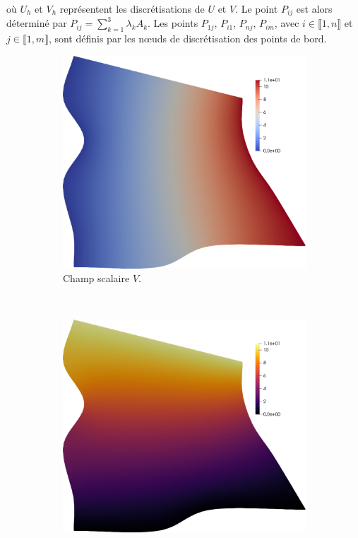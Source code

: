 où $U_h$ et $V_h$ représentent les discrétisations de $U$ et $V$. Le point $P_{ij}$ est alors déterminé par $P_{ij}=\sum_{k=1}^3\lambda_kA_k$. Les points $P_{1j}$, $P_{i1}$, $P_{nj}$, $P_{im}$, avec $i \in \llbracket 1, n \rrbracket$ et $j \in \llbracket 1, m \rrbracket$, sont définis par les nœuds de discrétisation des points de bord.
\begin{figure}[h!]
\centering
\begin{subfigure}{0.48\textwidth}
    \includegraphics[width=\textwidth]{images/quad_equation_1.pdf}
    \caption{Champ scalaire $V$.}
    \label{fig:quad_equation_1}
\end{subfigure}
\\[0.5cm]
\begin{subfigure}{0.48\textwidth}
    \includegraphics[width=\textwidth]{images/quad_equation_2.pdf}

\end{subfigure}
\end{figure}
